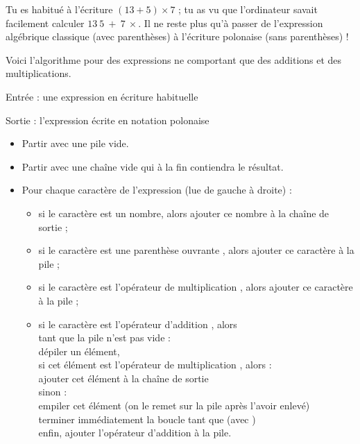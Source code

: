\documentclass[11pt,class=report,crop=false]{standalone}
\begin{document}
\begin{activite}

 
 
Tu es habitué à l'écriture \og{}$(13+5) \times 7$\fg{} ; tu as vu que l'ordinateur savait facilement calculer \og{}$13 \ 5 \ + \ 7 \ \times$\fg{}. Il ne reste plus qu'à passer de l'expression algébrique classique (avec parenthèses) à l'écriture polonaise (sans parenthèses) !

  Voici l'algorithme pour des expressions ne comportant que des additions et des multiplications. 
 
  \begin{algorithme}
  Entrée : une expression en écriture habituelle

  Sortie : l'expression écrite en notation polonaise

  \begin{itemize}
    \item  Partir avec une pile vide.  
    
    \item  Partir avec une chaîne vide  qui à la fin contiendra le résultat.
   
   \item Pour chaque caractère de l'expression (lue de gauche à droite) :
   \begin{itemize} 
     \item si le caractère est un nombre, alors ajouter ce nombre à la chaîne de sortie  ;
     
     \item si le caractère est une parenthèse ouvrante , alors ajouter ce caractère à la pile ;
     
     \item si le caractère est l'opérateur de multiplication , alors ajouter ce caractère à la pile ;  
        
     \item si le caractère est l'opérateur d'addition , alors \\
     tant que la pile n'est pas vide : \\
     \indentation dépiler un élément,\\
     \indentation si cet élément est l'opérateur de multiplication , alors :\\
     \indentation \indentation ajouter cet élément à la chaîne de sortie \\
     \indentation sinon :\\
     \indentation \indentation empiler cet élément (on le remet sur la pile après l'avoir enlevé)\\
     \indentation \indentation terminer immédiatement la boucle \og{}tant que\fg{} (avec )\\              
     enfin, ajouter l'opérateur d'addition  à la pile.


\end{itemize}
\end{itemize}
\end{algorithme}
\end{activite}
\end{document}
